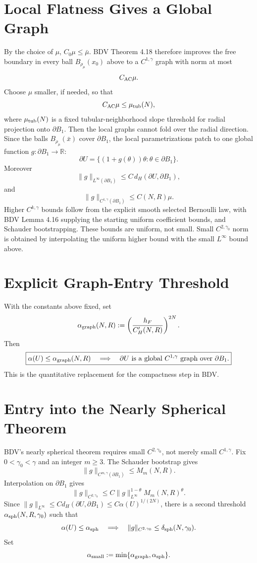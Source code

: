 \documentclass[11pt]{article}
\begin{document}
\section{Local Flatness Gives a Global Graph}

By the choice of \(\mu\), \(C_0\mu\le\bar\mu\). BDV Theorem 4.18 therefore
improves the free boundary in every ball \(B_{\rho_\mu}(x_0)\) above to a
\(C^{1,\gamma}\) graph with norm at most
\[
C_{\rm AC}\mu.
\]
Choose \(\mu\) smaller, if needed, so that
\[
C_{\rm AC}\mu\le \mu_{\rm tub}(N),
\]
where \(\mu_{\rm tub}(N)\) is a fixed tubular-neighborhood slope threshold for
radial projection onto \(\partial B_1\). Then the local graphs cannot fold over
the radial direction. Since the balls \(B_{\rho_\mu}(\bar x)\) cover
\(\partial B_1\), the local parametrizations patch to one global function
\(g:\partial B_1\to\mathbb R\):
\[
\partial U=\{(1+g(\theta))\theta:\theta\in\partial B_1\}.
\]
Moreover
\[
\|g\|_{L^\infty(\partial B_1)}
\le C\,d_H(\partial U,\partial B_1),
\]
and
\[
\|g\|_{C^{1,\gamma}(\partial B_1)}
\le C(N,R)\mu.
\]
Higher \(C^{k,\gamma}\) bounds follow from the explicit smooth selected
Bernoulli law, with BDV Lemma 4.16 supplying the starting uniform coefficient
bounds, and Schauder bootstrapping. These bounds are uniform, not small. Small
\(C^{2,\gamma_0}\) norm is obtained by interpolating the uniform higher bound
with the small \(L^\infty\) bound above.

\section{Explicit Graph-Entry Threshold}

With the constants above fixed, set
\[
\alpha_{\rm graph}(N,R)
:=
\left(\frac{h_F}{C_H'(N,R)}\right)^{2N}.
\]
Then
\[
\boxed{
\alpha(U)\le\alpha_{\rm graph}(N,R)
\quad\Longrightarrow\quad
\partial U\hbox{ is a global }C^{1,\gamma}\hbox{ graph over }\partial B_1.
}
\]
This is the quantitative replacement for the compactness step in BDV.

\section{Entry into the Nearly Spherical Theorem}

BDV's nearly spherical theorem requires small \(C^{2,\gamma_0}\), not merely
small \(C^{1,\gamma}\). Fix \(0<\gamma_0<\gamma\) and an integer \(m\ge3\).
The Schauder bootstrap gives
\[
\|g\|_{C^{m,\gamma}(\partial B_1)}\le M_m(N,R).
\]
Interpolation on \(\partial B_1\) gives
\[
\|g\|_{C^{2,\gamma_0}}
\le
C\|g\|_{L^\infty}^{1-\theta}M_m(N,R)^\theta.
\]
Since \(\|g\|_{L^\infty}\le C d_H(\partial U,\partial B_1)
\le C\alpha(U)^{1/(2N)}\), there is a second threshold
\(\alpha_{\rm sph}(N,R,\gamma_0)\) such that
\[
\alpha(U)\le \alpha_{\rm sph}
\quad\Longrightarrow\quad
\|g\|_{C^{2,\gamma_0}}\le\delta_{\rm sph}(N,\gamma_0).
\]
Set
\[
\alpha_{\rm small}:=\min\{\alpha_{\rm graph},\alpha_{\rm sph}\}.
\]
\end{document}

